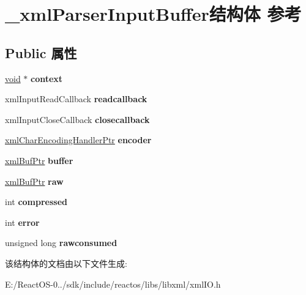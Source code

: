 \hypertarget{struct__xml_parser_input_buffer}{}\section{\+\_\+xml\+Parser\+Input\+Buffer结构体 参考}
\label{struct__xml_parser_input_buffer}
\subsection*{Public 属性}
\begin{DoxyCompactItemize}
\item 
\mbox{\label{struct__xml_parser_input_buffer_a6396a2f2ac55266f0b1bf01d6230d475}} 
\hyperlink{interfacevoid}{void} $\ast$ {\bfseries context}
\item 
\mbox{\label{struct__xml_parser_input_buffer_a69f574b183e3acafcfb08e97370ca38a}} 
xml\+Input\+Read\+Callback {\bfseries readcallback}
\item 
\mbox{\label{struct__xml_parser_input_buffer_a2da9a3f7231857d19ac2ee41c61dfee2}} 
xml\+Input\+Close\+Callback {\bfseries closecallback}
\item 
\mbox{\label{struct__xml_parser_input_buffer_af72974d4e9a48cdbd29c5071d07f3d69}} 
\hyperlink{struct__xml_char_encoding_handler}{xml\+Char\+Encoding\+Handler\+Ptr} {\bfseries encoder}
\item 
\mbox{\label{struct__xml_parser_input_buffer_a0fd90f78724b8b53970154b6b315bd83}} 
\hyperlink{struct__xml_buf}{xml\+Buf\+Ptr} {\bfseries buffer}
\item 
\mbox{\label{struct__xml_parser_input_buffer_afe725b3943ff433acdf0095d167b101e}} 
\hyperlink{struct__xml_buf}{xml\+Buf\+Ptr} {\bfseries raw}
\item 
\mbox{\label{struct__xml_parser_input_buffer_aa17c64fa46053ce3e42ac219d15418d4}} 
int {\bfseries compressed}
\item 
\mbox{\label{struct__xml_parser_input_buffer_a5759b0b008b6fda05e9e850ed7bea149}} 
int {\bfseries error}
\item 
\mbox{\label{struct__xml_parser_input_buffer_a1a63d0654d57e0d2a7ba52a06dc35b4a}} 
unsigned long {\bfseries rawconsumed}
\end{DoxyCompactItemize}


该结构体的文档由以下文件生成\+:\begin{DoxyCompactItemize}
\item 
E\+:/\+React\+O\+S-\/0../sdk/include/reactos/libs/libxml/xml\+I\+O.\+h\end{DoxyCompactItemize}
